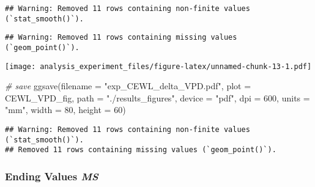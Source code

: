 \documentclass[
]{article}
\newenvironment{Shaded}{\begin{snugshade}}{\end{snugshade}}
\newcommand{\AttributeTok}[1]{\textcolor[rgb]{0.77,0.63,0.00}{#1}}
\newcommand{\CommentTok}[1]{\textcolor[rgb]{0.56,0.35,0.01}{\textit{#1}}}
\newcommand{\DecValTok}[1]{\textcolor[rgb]{0.00,0.00,0.81}{#1}}
\newcommand{\FunctionTok}[1]{\textcolor[rgb]{0.00,0.00,0.00}{#1}}
\newcommand{\NormalTok}[1]{#1}
\newcommand{\StringTok}[1]{\textcolor[rgb]{0.31,0.60,0.02}{#1}}
\begin{document}
\begin{verbatim}
## Warning: Removed 11 rows containing non-finite values (`stat_smooth()`).
\end{verbatim}

\begin{verbatim}
## Warning: Removed 11 rows containing missing values (`geom_point()`).
\end{verbatim}

\texttt{[image: analysis\_experiment\_files/figure-latex/unnamed-chunk-13-1.pdf]}

\begin{Shaded}
\begin{Highlighting}[]
\CommentTok{\# save}
\FunctionTok{ggsave}\NormalTok{(}\AttributeTok{filename =} \StringTok{"exp\_CEWL\_delta\_VPD.pdf"}\NormalTok{,}
       \AttributeTok{plot =}\NormalTok{ CEWL\_VPD\_fig,}
       \AttributeTok{path =} \StringTok{"./results\_figures"}\NormalTok{,}
       \AttributeTok{device =} \StringTok{"pdf"}\NormalTok{,}
       \AttributeTok{dpi =} \DecValTok{600}\NormalTok{,}
       \AttributeTok{units =} \StringTok{"mm"}\NormalTok{,}
       \AttributeTok{width =} \DecValTok{80}\NormalTok{, }\AttributeTok{height =} \DecValTok{60}\NormalTok{)}
\end{Highlighting}
\end{Shaded}

\begin{verbatim}
## Warning: Removed 11 rows containing non-finite values (`stat_smooth()`).
## Removed 11 rows containing missing values (`geom_point()`).
\end{verbatim}

\hypertarget{ending-values-ms-3}{%
\subsubsection{\texorpdfstring{Ending Values
\emph{MS}}{Ending Values MS}}\label{ending-values-ms-3}}
\end{document}

